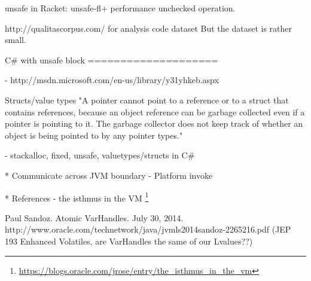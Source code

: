 unsafe in Racket: unsafe-fl+ performance unchecked operation.



http://qualitascorpus.com/ for analysis code dataset
But the dataset is rather small.


C\# with unsafe block
====================

- http://msdn.microsoft.com/en-us/library/y31yhkeb.aspx

Structs/value types
"A pointer cannot point to a reference or to a struct that contains references,
because an object reference can be garbage collected even if a pointer is 
pointing to it. The garbage collector does not keep track of whether an 
object is being pointed to by any pointer types."

- stackalloc, fixed, unsafe, valuetypes/structs in C\#

* Communicate across JVM boundary
- Platform invoke


* References
  - the isthmus in the VM
  \footnote{\url{https://blogs.oracle.com/jrose/entry/the_isthmus_in_the_vm}}

Paul Sandoz. Atomic VarHandles. July 30, 2014.
http://www.oracle.com/technetwork/java/jvmls2014sandoz-2265216.pdf
(JEP 193 Enhanced Volatiles, are VarHandles the same of our Lvalues??)
